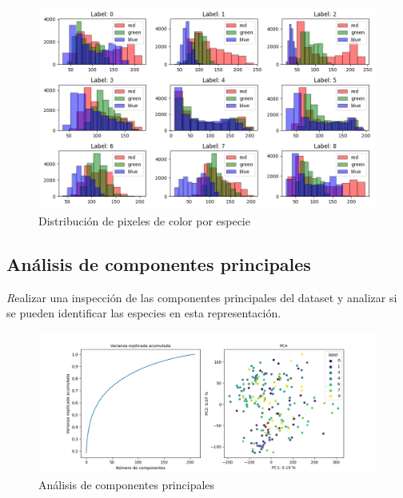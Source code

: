\documentclass{article}
\begin{document}

\begin{figure}[h!]
  \centering    
  \includegraphics[width=1\textwidth]{8_3_pixeles_especies_color.png}
  \caption{Distribución de pixeles de color por especie}
\end{figure}
\pagebreak

\subsection{Análisis de componentes principales}

{\emph Realizar una inspección de las componentes principales del dataset y analizar si se
pueden identiﬁcar las especies en esta representación.}

\begin{figure}[h!]
  \centering    
  \includegraphics[width=1\textwidth]{9_1_pca.png}
  \caption{Análisis de componentes principales}
\end{figure}

\end{document}
